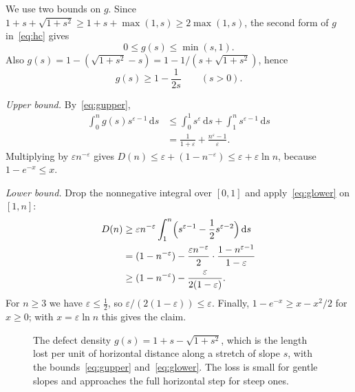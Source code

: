 \documentclass[journal]{IEEEtran}
\newcommand{\eps}{\varepsilon}
\newcommand{\dd}{\,\mathrm{d}}
\begin{document}
\begin{IEEEproof}
We use two bounds on $g$. Since $1+s+\sqrt{1+s^2}\ge1+s+\max(1,s)\ge2\max(1,s)$, the second
form of $g$ in~\eqref{eq:hc} gives
\begin{equation}\label{eq:gupper}
  0\le g(s)\le\min(s,1).
\end{equation}
Also $g(s)=1-(\sqrt{1+s^2}-s)=1-1/(s+\sqrt{1+s^2})$, hence
\begin{equation}\label{eq:glower}
  g(s)\ge1-\frac{1}{2s}\qquad(s>0).
\end{equation}

\emph{Upper bound.} By~\eqref{eq:gupper},
\begin{align*}
  \int_0^ng(s)s^{\eps-1}\dd s&\le\int_0^1s^{\eps}\dd s+\int_1^ns^{\eps-1}\dd s\\
  &=\frac{1}{1+\eps}+\frac{n^{\eps}-1}{\eps}.
\end{align*}
Multiplying by $\eps n^{-\eps}$ gives $D(n)\le\eps+(1-n^{-\eps})\le\eps+\eps\ln n$, because
$1-e^{-x}\le x$.

\emph{Lower bound.} Drop the nonnegative integral over $[0,1]$ and apply~\eqref{eq:glower}
on $[1,n]$:
\begin{align*}
  D(n)&\ge\eps n^{-\eps}\int_1^n\Bigl(s^{\eps-1}-\frac12s^{\eps-2}\Bigr)\dd s\\
  &=(1-n^{-\eps})-\frac{\eps n^{-\eps}}{2}\cdot\frac{1-n^{\eps-1}}{1-\eps}\\
  &\ge(1-n^{-\eps})-\frac{\eps}{2(1-\eps)}.
\end{align*}
For $n\ge3$ we have $\eps\le\frac12$, so $\eps/(2(1-\eps))\le\eps$. Finally,
$1-e^{-x}\ge x-x^2/2$ for $x\ge0$; with $x=\eps\ln n$ this gives the claim.
\end{IEEEproof}

\begin{figure}[!t]
\centering
{}
\caption{The defect density $g(s)=1+s-\sqrt{1+s^2}$, which is the length lost per unit of
horizontal distance along a stretch of slope $s$, with the bounds~\eqref{eq:gupper}
and~\eqref{eq:glower}. The loss is small for gentle slopes and approaches the full horizontal
step for steep ones.}
\label{fig:g}
\end{figure}
\end{document}
